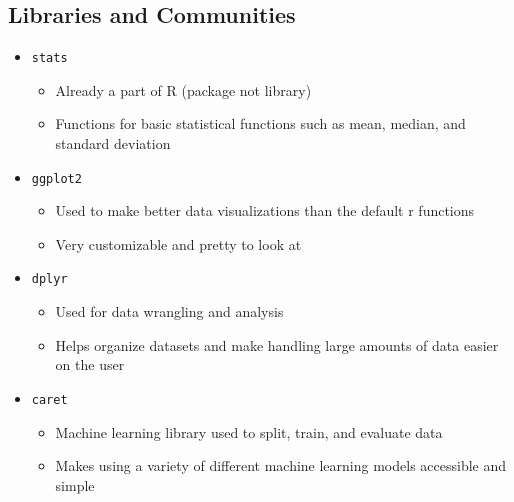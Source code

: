 \subsection{Libraries and Communities}
\begin{itemize}
	\item \texttt{stats}
	\begin{itemize}
		\item Already a part of R (package not library)
		\item Functions for basic statistical functions such as mean, median, and standard deviation
	\end{itemize}

	\item \texttt{ggplot2}
	\begin{itemize}
		\item Used to make better data visualizations than the default r functions
		\item Very customizable and pretty to look at
	\end{itemize}

	\item \texttt{dplyr}
	\begin{itemize}
		\item Used for data wrangling and analysis
		\item Helps organize datasets and make handling large amounts of data easier on the user
	\end{itemize}

	\item \texttt{caret}
	\begin{itemize}
		\item Machine learning library used to split, train, and evaluate data
		\item Makes using a variety of different machine learning models accessible and simple
	\end{itemize}
\end{itemize}
